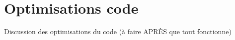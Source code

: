 \chapter{Optimisations code}
\label{chaper-5}

Discussion des optimisations du code (à faire APRÈS que tout fonctionne)
